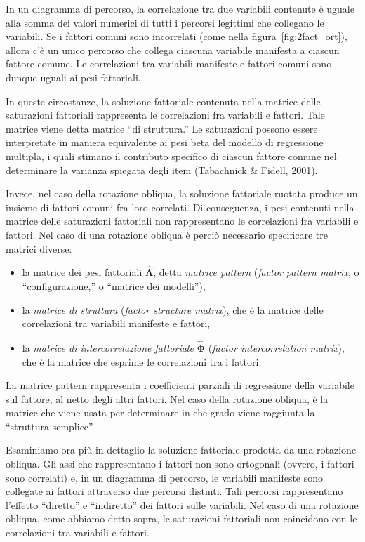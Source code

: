In un diagramma di percorso, la correlazione tra due variabili contenute è uguale alla somma dei valori numerici di tutti i percorsi legittimi che collegano le   variabili. 
Se i fattori comuni sono incorrelati (come nella figura~\ref{fig:2fact_ort}), allora c'è un unico percorso che collega ciascuna variabile manifesta a ciascun fattore comune. 
Le correlazioni tra variabili manifeste e fattori comuni sono dunque uguali ai pesi fattoriali.
 
In queste circostanze, la soluzione fattoriale contenuta nella matrice delle saturazioni fattoriali rappresenta le correlazioni fra variabili e fattori. Tale matrice viene detta  matrice ``di struttura.''  
Le saturazioni possono essere interpretate in maniera equivalente ai pesi beta del modello di regressione multipla, i quali stimano il contributo specifico di ciascun fattore comune nel determinare la varianza spiegata degli item (Tabachnick \& Fidell, 2001).

Invece, nel caso della rotazione obliqua, la soluzione fattoriale ruotata produce un insieme di fattori comuni fra loro correlati. 
Di conseguenza, i pesi contenuti nella matrice delle saturazioni fattoriali non rappresentano le correlazioni fra variabili e fattori. 
Nel caso di una rotazione obliqua è perciò necessario specificare tre matrici diverse: 
\begin{itemize}
\item la matrice dei pesi fattoriali $\hat{\boldsymbol{\Lambda}}$, detta \emph{matrice pattern} (\emph{factor pattern matrix}, o ``configurazione,'' o ``matrice dei modelli''), 
\item la \emph{matrice di struttura} (\textit{factor structure matrix}), che è la matrice delle correlazioni tra variabili manifeste e fattori, 
\item la \emph{matrice di intercorrelazione fattoriale} $\hat{\boldsymbol{\Phi}}$ (\textit{factor intercorrelation matrix}), che è la matrice che esprime le correlazioni tra i fattori. 
\end{itemize}

La matrice pattern rappresenta i coefficienti parziali di regressione della variabile sul fattore, al netto degli altri fattori. 
Nel caso della rotazione obliqua, è la matrice che viene usata per determinare in che grado viene raggiunta la ``struttura semplice''.

Esaminiamo ora più in dettaglio la soluzione fattoriale prodotta da una rotazione obliqua. 
Gli assi che rappresentano i fattori non sono ortogonali (ovvero, i fattori sono correlati) e, in un diagramma di percorso, le variabili manifeste sono collegate ai fattori attraverso due percorsi distinti. 
Tali percorsi rappresentano l'effetto ``diretto'' e ``indiretto'' dei fattori sulle variabili. 
Nel caso di una rotazione obliqua, come abbiamo detto sopra, le saturazioni fattoriali non coincidono con le correlazioni tra variabili e fattori.

